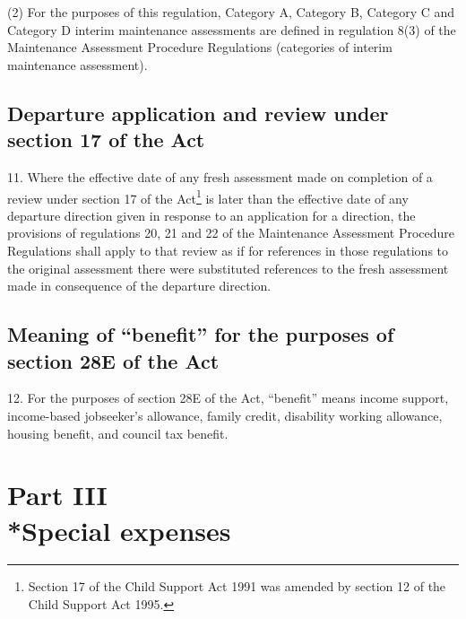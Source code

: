 \documentclass[a4paper]{article}
\newcommand{\parthead}{}
\begin{document}
(2) For the purposes of this regulation, Category A, Category B, Category C and
Category D interim maintenance assessments are defined in regulation 8(3) of the
Maintenance Assessment Procedure Regulations (categories of interim maintenance
assessment).

\subsection[11. Departure application and review under section 17 of the Act]{Departure application and review under section 17 of the Act}

11. Where the
effective date of any fresh assessment made on completion of a review under
section 17 of the Act\footnote{\frenchspacing Section 17 of the Child Support Act 1991 was amended by section 12 of the Child Support Act 1995.} is later than the effective date of any departure
direction given in response to an application for a direction, the provisions of
regulations 20, 21 and 22 of the Maintenance Assessment Procedure Regulations
shall apply to that review as if for references in those regulations to the
original assessment there were substituted references to the fresh assessment
made in consequence of the departure direction.

\subsection[12. Meaning of “benefit” for the purposes of section 28E of the Act]{Meaning of “benefit” for the purposes of section 28E of the Act}

12. For the
purposes of section 28E of the Act, “benefit” means income support, income-based
jobseeker’s allowance, family credit, disability working allowance, housing
benefit, and council tax benefit.

\section[Part III --- Special expenses]{Part III\\*Special expenses}

\renewcommand\parthead{--- Part III}
\end{document}
